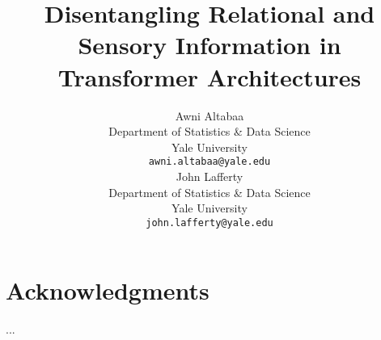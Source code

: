 \documentclass{article}
\title{Disentangling Relational and Sensory Information in Transformer Architectures}
\author{%
  Awni Altabaa\\ %
  Department of Statistics \& Data Science\\
  Yale University\\
  \texttt{awni.altabaa@yale.edu} \\
  \And
  John Lafferty \\
  Department of Statistics \& Data Science \\
  Yale University \\
  \texttt{john.lafferty@yale.edu}
}
\begin{document}
\maketitle


















\section*{Acknowledgments}
...

\printbibliography


\listoffixmes

\clearpage
\newpage


\appendix






\end{document}
